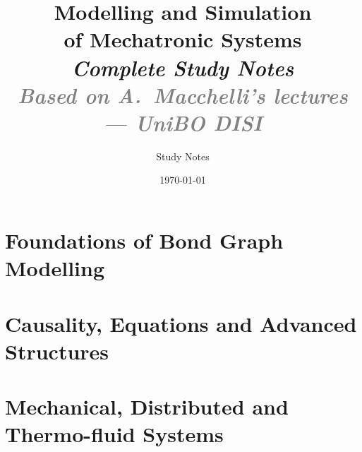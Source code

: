 \documentclass[10pt,a4paper, openany]{book}
\theoremstyle{definition}
\theoremstyle{remark}
\begin{document}

\title{\vspace{-1cm}
  \LARGE\bfseries Modelling and Simulation\\of Mechatronic Systems\\[0.5cm]
  \large\normalfont\itshape Complete Study Notes\\[0.3cm]
  \normalsize\textcolor{gray}{Based on A.~Macchelli's lectures --- UniBO DISI}}
\author{Study Notes}
\date{\today}
\maketitle\thispagestyle{empty}

\tableofcontents\newpage

\part{Foundations of Bond Graph Modelling}
 
 
 

\part{Causality, Equations and Advanced Structures}
 
 

\part{Mechanical, Distributed and Thermo-fluid Systems}
 
 
 
\end{document}
